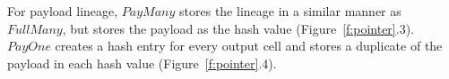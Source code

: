 For payload lineage, $PayMany$ stores the lineage in a similar manner as
$FullMany$, but stores the payload as the hash value
(Figure~\ref{f:pointer}.3).  $PayOne$ creates a hash entry for every output
cell and stores a duplicate of the payload in each hash value
(Figure~\ref{f:pointer}.4).

















